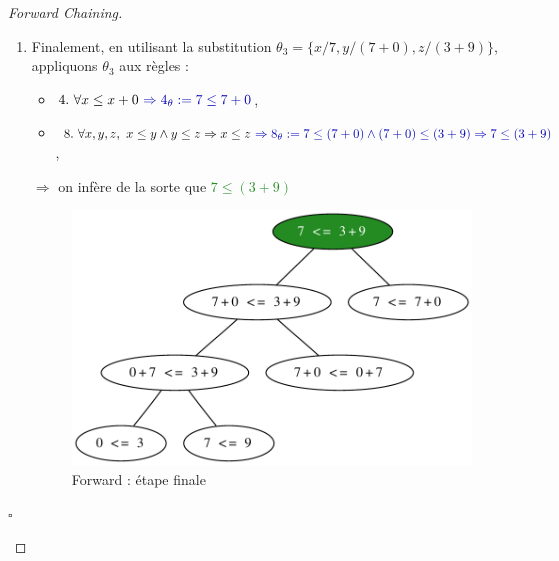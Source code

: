 \documentclass{article}
\newcommand{\blu}[1]{\textcolor{darkblue}{#1}}
\newcommand{\forest}[1]{\textcolor{forestgreen}{#1}}
\newtheorem{proof}{Preuve}
\begin{document}
\begin{sffamily}
\begin{enumerate}
\begin{proof}[Forward Chaining]
\begin{enumerate}[1.]
\item Finalement, en utilisant la substitution $\theta_3 = \{x/7, y/(7+0), z/(3+9)\}$,\\
appliquons $\theta_3$ aux règles : 
\begin{itemize}
\item $4.\ \forall x \leq x + 0\ \blu{\Rightarrow 4_\theta := 7 \leq 7+0}$,
\item $8.\ \forall x, y, z,\ x \leq y \wedge y \leq z \Rightarrow x \leq z\ \blu{\Rightarrow 8_\theta := 7 \leq (7+0) \wedge 
(7+0) \leq (3+9) \Rightarrow 7 \leq (3+9)}$,
\end{itemize}
$\Rightarrow$ on infère de la sorte que \forest{$\boxed{7\leq (3+9)}$}
\begin{figure}[h!]
    \begin{center}
    \includegraphics[scale=0.5]{forwardend.pdf}
    \caption{Forward : étape finale}
    \end{center}	
\end{figure}
\end{enumerate}
\begin{flushright}
$\square$
\end{flushright}
\end{proof}

\end{enumerate}

\end{sffamily}
\end{document}
